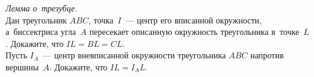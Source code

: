 \begin{problems}
\item \emph{Лемма о~трезубце.}
\\
\subproblem
Дан треугольник $ABC$, точка~$I$~--- центр его вписанной окружности,
а~биссектриса угла~$A$ пересекает описанную окружность треугольника
в~точке~$L$.
Докажите, что $IL = BL = CL$.
\\
\subproblem
Пусть $I_A$~--- центр вневписанной окружности треугольника $ABC$
напротив вершины~$A$.
Докажите, что $IL = I_A L$.

\end{problems}

